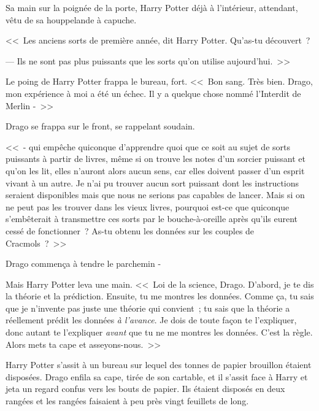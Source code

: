 Sa main sur la poignée de la porte, Harry Potter déjà à l'intérieur, attendant, vêtu de sa houppelande à capuche.

<<~Les anciens sorts de première année, dit Harry Potter. Qu'as-tu découvert~?

--- Ils ne sont pas plus puissants que les sorts qu'on utilise aujourd'hui.~>>

Le poing de Harry Potter frappa le bureau, fort. <<~Bon sang. Très bien. Drago, mon expérience à moi a été un échec. Il y a quelque chose nommé l'Interdit de Merlin -~>>

Drago se frappa sur le front, se rappelant soudain.

<<~- qui empêche quiconque d'apprendre quoi que ce soit au sujet de sorts puissants à partir de livres, même si on trouve les notes d'un sorcier puissant et qu'on les lit, elles n'auront alors aucun sens, car elles doivent passer d'un esprit vivant à un autre. Je n'ai pu trouver aucun sort puissant dont les instructions seraient disponibles mais que nous ne serions pas capables de lancer. Mais si on ne peut pas les trouver dans les vieux livres, pourquoi est-ce que quiconque s'embêterait à transmettre ces sorts par le bouche-à-oreille après qu'ils eurent cessé de fonctionner~? As-tu obtenu les données sur les couples de Cracmols~?~>>

Drago commença à tendre le parchemin -

Mais Harry Potter leva une main. <<~Loi de la science, Drago. D'abord, je te dis la théorie et la prédiction. Ensuite, tu me montres les données. Comme ça, tu sais que je n'invente pas juste une théorie qui convient~; tu sais que la théorie a réellement prédit les données \emph{à l'avance}. Je dois de toute façon te l'expliquer, donc autant te l'expliquer \emph{avant} que tu ne me montres les données. C'est la règle. Alors mets ta cape et asseyons-nous.~>>

Harry Potter s'assit à un bureau sur lequel des tonnes de papier brouillon étaient disposées. Drago enfila sa cape, tirée de son cartable, et il s'assit face à Harry et jeta un regard confus vers les bouts de papier. Ils étaient disposés en deux rangées et les rangées faisaient à peu près vingt feuillets de long.

